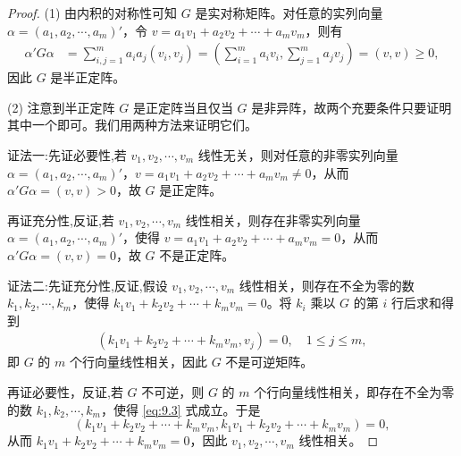 \documentclass[../../main.tex]{subfiles}
\begin{document}
\begin{proof}
(1) 由内积的对称性可知 $G$ 是实对称矩阵。对任意的实列向量 $\alpha=(a_1,a_2,\cdots,a_m)'$，令 $v = a_1v_1 + a_2v_2 + \cdots + a_mv_m$，则有
\begin{align*}
\alpha'G\alpha&=\sum_{i,j = 1}^{m}a_ia_j(v_i,v_j)=(\sum_{i = 1}^{m}a_iv_i,\sum_{j = 1}^{m}a_jv_j)=(v,v)\geq0,
\end{align*}
因此 $G$ 是半正定阵。

(2) 注意到半正定阵 $G$ 是正定阵当且仅当 $G$ 是非异阵，故两个充要条件只要证明其中一个即可。我们用两种方法来证明它们。

{\color{blue}证法一:}先证必要性,若 $v_1,v_2,\cdots,v_m$ 线性无关，则对任意的非零实列向量 $\alpha=(a_1,a_2,\cdots,a_m)'$，$v = a_1v_1 + a_2v_2 + \cdots + a_mv_m\neq0$，从而 $\alpha'G\alpha=(v,v)>0$，故 $G$ 是正定阵。

再证充分性,反证,若 $v_1,v_2,\cdots,v_m$ 线性相关，则存在非零实列向量 $\alpha=(a_1,a_2,\cdots,a_m)'$，使得 $v = a_1v_1 + a_2v_2 + \cdots + a_mv_m = 0$，从而 $\alpha'G\alpha=(v,v)=0$，故 $G$ 不是正定阵。

{\color{blue}证法二:}先证充分性,反证,假设 $v_1,v_2,\cdots,v_m$ 线性相关，则存在不全为零的数 $k_1,k_2,\cdots,k_m$，使得 $k_1v_1 + k_2v_2 + \cdots + k_mv_m = 0$。将 $k_i$ 乘以 $G$ 的第 $i$ 行后求和得到
\begin{align}
(k_1v_1 + k_2v_2 + \cdots + k_mv_m,v_j)=0,\quad 1\leq j\leq m,\label{eq:9.3}
\end{align}
即 $G$ 的 $m$ 个行向量线性相关，因此 $G$ 不是可逆矩阵。

再证必要性，反证,若 $G$ 不可逆，则 $G$ 的 $m$ 个行向量线性相关，即存在不全为零的数 $k_1,k_2,\cdots,k_m$，使得 \eqref{eq:9.3} 式成立。于是
\[
(k_1v_1 + k_2v_2 + \cdots + k_mv_m,k_1v_1 + k_2v_2 + \cdots + k_mv_m)=0,
\]
从而 $k_1v_1 + k_2v_2 + \cdots + k_mv_m = 0$，因此 $v_1,v_2,\cdots,v_m$ 线性相关。
\end{proof}
\end{document}
